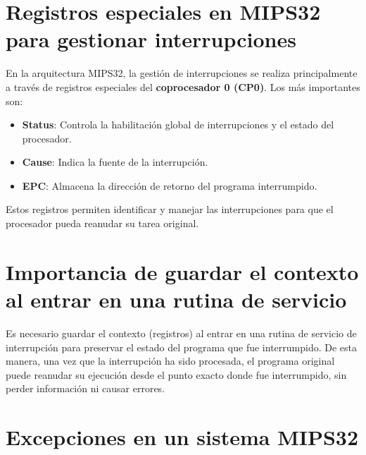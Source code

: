 \documentclass[12pt,a4paper]{article}
\begin{document}
	
	\section{Registros especiales en MIPS32 para gestionar interrupciones}
	
	En la arquitectura MIPS32, la gestión de interrupciones se realiza principalmente a través de registros especiales del \textbf{coprocesador 0 (CP0)}. Los más importantes son:
	
	\begin{itemize}
		\item \textbf{Status}: Controla la habilitación global de interrupciones y el estado del procesador.
		\item \textbf{Cause}: Indica la fuente de la interrupción.
		\item \textbf{EPC}: Almacena la dirección de retorno del programa interrumpido.
	\end{itemize}
	
	Estos registros permiten identificar y manejar las interrupciones para que el procesador pueda reanudar su tarea original.
	
	
	\section{Importancia de guardar el contexto al entrar en una rutina de servicio}
	
	Es necesario guardar el contexto (registros) al entrar en una rutina de servicio de interrupción para preservar el estado del programa que fue interrumpido. De esta manera, una vez que la interrupción ha sido procesada, el programa original puede reanudar su ejecución desde el punto exacto donde fue interrumpido, sin perder información ni causar errores.
	
	
	\section{Excepciones en un sistema MIPS32}
	
\end{document}
